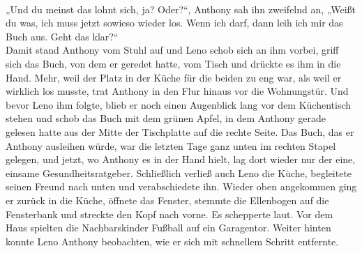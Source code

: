 \documentclass[ngerman,smalldemyvopaper,11pt,oneside,onecolumn,openright,extrafontsizes]{memoir}
\begin{document}
\vspace{0.5em} \\
„Und du meinst das lohnt sich, ja? Oder?“, Anthony sah ihn zweifelnd an, „Weißt du was, ich muss jetzt sowieso wieder los. Wenn ich darf, dann leih ich mir das Buch aus. Geht das klar?“
\vspace{0.5em} \\
Damit stand Anthony vom Stuhl auf und Leno schob sich an ihm vorbei, griff sich das Buch, von dem er geredet hatte, vom Tisch und drückte es ihm in die Hand. Mehr, weil der Platz in der Küche für die beiden zu eng war, als weil er wirklich los musste, trat Anthony in den Flur hinaus vor die Wohnungstür. Und bevor Leno ihm folgte, blieb er noch einen Augenblick lang vor dem Küchentisch stehen und schob das Buch mit dem grünen Apfel, in dem Anthony gerade gelesen hatte aus der Mitte der Tischplatte auf die rechte Seite. Das Buch, das er Anthony ausleihen würde, war die letzten Tage ganz unten im rechten Stapel gelegen, und jetzt, wo Anthony es in der Hand hielt, lag dort wieder nur der eine, einsame Gesundheitsratgeber. Schließlich verließ auch Leno die Küche, begleitete seinen Freund nach unten und verabschiedete ihn. Wieder oben angekommen ging er zurück in die Küche, öffnete das Fenster, stemmte die Ellenbogen auf die Fensterbank und streckte den Kopf nach vorne. Es schepperte laut. Vor dem Haus spielten die Nachbarskinder Fußball auf ein Garagentor. Weiter hinten konnte Leno Anthony beobachten, wie er sich mit schnellem Schritt entfernte.
\end{document}
